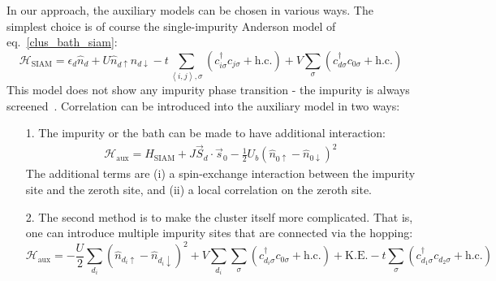 \documentclass{report}
\numberwithin{equation}{section}
\begin{document}
In our approach, the auxiliary models can be chosen in various ways. The simplest choice is of course the single-impurity Anderson model of eq.~\ref{clus_bath_siam}:
\begin{equation}
\mathcal{H}_\text{SIAM} = \epsilon_d \hat n_d + U \hat n_{d \uparrow} \hat n_{d \downarrow} - t\sum_{\left<i,j \right>, \sigma}\left(c^\dagger_{i\sigma}c_{j\sigma} + \text{h.c.}\right) + V\sum_\sigma \left( c^\dagger_{d\sigma}c_{0\sigma} + \text{h.c.}\right) 
\end{equation}
This model does not show any impurity phase transition - the impurity is always screened~\cite{hrk_wilson_1980,wilson1975,bullaNRGreview}. Correlation can be introduced into the auxiliary model in two ways:
\begin{itemize}
	\item[1.] The impurity or the bath can be made to have additional interaction: 
\begin{gather}
\mathcal{H}_\text{aux} = H_\text{SIAM} + J \vec{S}_d\cdot\vec{s}_0 - \frac{1}{2}U_b \left(\hat n_{0 \uparrow} - \hat n_{0 \downarrow}\right)^2
\end{gather}
The additional terms are (i) a spin-exchange interaction between the impurity site and the zeroth site, and (ii) a local correlation on the zeroth site.
\item[2.] The second method is to make the cluster itself more complicated. That is, one can introduce multiple impurity sites that are connected via the hopping:
\begin{equation}
\mathcal{H}_\text{aux} = -\frac{U}{2}\sum_{d_i}\left(\hat n_{d_i \uparrow} - \hat n_{d_i \downarrow}\right) ^2 + V\sum_{d_i}\sum_\sigma\left( c^\dagger_{d_i\sigma}c_{0\sigma} + \text{h.c.} \right) + \text{K.E.} - t\sum_{\sigma}\left(c^\dagger_{d_1\sigma}c_{d_2\sigma} + \text{h.c.}\right)
\end{equation}
	
\end{itemize}
\end{document}
